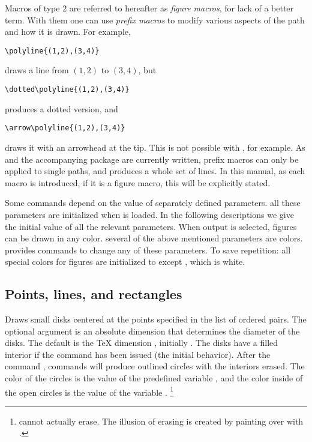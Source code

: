 \documentclass[letterpaper]{article}
\begin{document}
Macros of type 2 are referred to hereafter as \emph{figure macros}, for
lack of a better term. With them one can use \emph{prefix
macros} to modify various aspects of the path and
how it is drawn. For example,
\begin{verbatim}
\polyline{(1,2),(3,4)}
\end{verbatim}
draws a line from $(1,2)$ to $(3,4)$, but
\begin{verbatim}
\dotted\polyline{(1,2),(3,4)}
\end{verbatim}
produces a dotted version, and
\begin{verbatim}
\arrow\polyline{(1,2),(3,4)}
\end{verbatim}
draws it with an arrowhead at the tip. This is not possible with
, for example. As \mfp{} and the accompanying \MF{}
package \grafbase{} are currently written, prefix macros can only be
applied to single paths, and  produces a whole set of
lines. In this manual, as each macro is introduced, if it is a figure
macro, this will be explicitly stated.

Some commands depend on the value of separately defined parameters. all
these parameters are initialized when \mfp{} is loaded. In the following
descriptions we give the initial value of all the relevant parameters.
When \MP{} output is selected, figures can be drawn in any color.
several of the above mentioned parameters are colors. \mfp{} provides
commands to change any of these parameters. To save repetition: all
special colors for figures are initialized to  except
, which is white.


\subsection{Points, lines, and rectangles}\label{points}

\begin{cd}
%
\end{cd}

Draws small disks centered at the points specified in the list of
ordered pairs. The optional argument  is an absolute
dimension that determines the diameter of the disks. The default is the
\TeX{} dimension , initially \dim{2pt}. The disks have a
filled interior if the command  has been issued (the
initial behavior). After the command , 
commands will produce outlined circles with the interiors erased. The
color of the circles is the value of the predefined variable
, and the color inside of the open circles is the value
of the variable .%
    \footnote{\MP{} cannot actually erase. The illusion of erasing is
    created by painting over with .}
\end{document}
